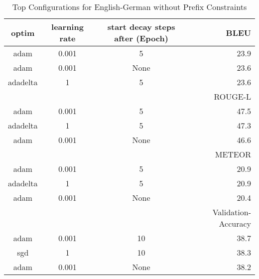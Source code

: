 \begin{table}
	\caption{Top Configurations for English-German without Prefix Constraints}
	\label{tab:optim_clean-de-en}
	\centering
\begin{tabular}{|c|c|c|r|}
	\hline
	optim   & learning rate & start decay steps after (Epoch)  & BLEU\\
	\hline
	  adam  &     0.001    &        5      & 23.9 \\
	  adam  &     0.001    &       None      & 23.6 \\
	adadelta&       1      &        5      & 23.6 \\
	\hline
	\hline
	& & & ROUGE-L \\
	\hline
	adam  &     0.001    &        5      & 47.5 \\
	adadelta&       1    &        5      & 47.3 \\
	adam  &     0.001    &       None      & 46.6 \\
	\hline
	\hline
	& & & METEOR \\
	\hline
	  adam  &     0.001    &        5      & 20.9 \\
	adadelta&       1      &        5      & 20.9 \\
	  adam  &     0.001    &       None      & 20.4 \\
	\hline
	\hline
	& & & Validation-Accuracy \\
	\hline
	  adam  &     0.001    &       10      & 38.7 \\
	  sgd   &       1      &       10      & 38.3 \\
	  adam  &     0.001    &       None      & 38.2 \\
	\hline
\end{tabular}
\end{table}
